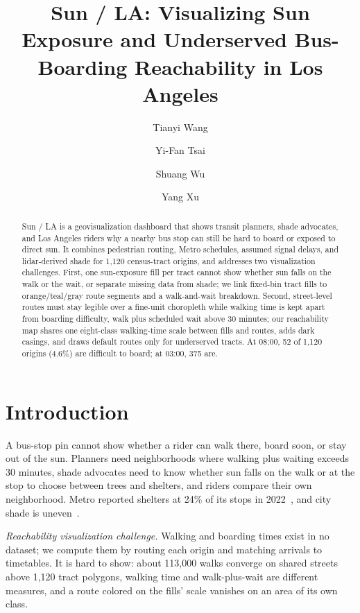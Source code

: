 \documentclass[runningheads,a4paper]{llncs}
\begin{document}
\title{Sun / LA: Visualizing Sun Exposure and Underserved Bus-Boarding Reachability in Los Angeles}
\author{Tianyi Wang \and Yi-Fan Tsai \and Shuang Wu \and Yang Xu}
\maketitle
\begin{abstract}
Sun / LA is a geovisualization dashboard that shows transit planners, shade advocates, and Los Angeles riders why a nearby bus stop can still be hard to board or exposed to direct sun. It combines pedestrian routing, Metro schedules, assumed signal delays, and lidar-derived shade for 1,120 census-tract origins, and addresses two visualization challenges. First, one sun-exposure fill per tract cannot show whether sun falls on the walk or the wait, or separate missing data from shade; we link fixed-bin tract fills to orange/teal/gray route segments and a walk-and-wait breakdown. Second, street-level routes must stay legible over a fine-unit choropleth while walking time is kept apart from boarding difficulty, walk plus scheduled wait above 30 minutes; our reachability map shares one eight-class walking-time scale between fills and routes, adds dark casings, and draws default routes only for underserved tracts. At 08:00, 52 of 1,120 origins (4.6\%) are difficult to board; at 03:00, 375 are.
\end{abstract}

\section{Introduction}
A bus-stop pin cannot show whether a rider can walk there, board soon, or stay out of the sun. Planners need neighborhoods where walking plus waiting exceeds 30 minutes, shade advocates need to know whether sun falls on the walk or at the stop to choose between trees and shelters, and riders compare their own neighborhood. Metro reported shelters at 24\% of its stops in 2022~\cite{metro2022}, and city shade is uneven~\cite{reginald2024}.

\emph{Reachability visualization challenge.} Walking and boarding times exist in no dataset; we compute them by routing each origin and matching arrivals to timetables. It is hard to show: about 113,000 walks converge on shared streets above 1,120 tract polygons, walking time and walk-plus-wait are different measures, and a route colored on the fills' scale vanishes on an area of its own class.
\end{document}
